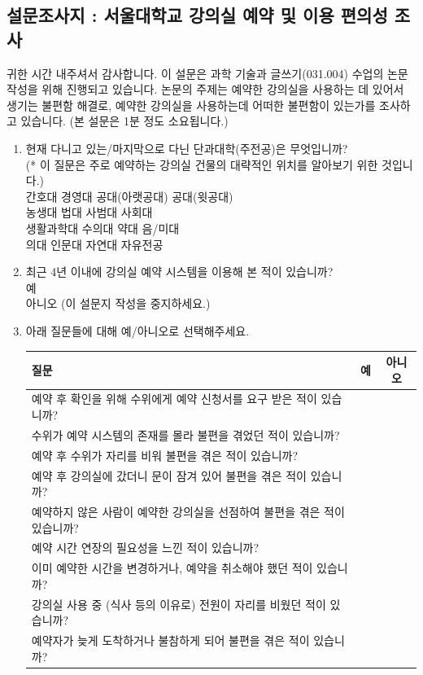 \documentclass[11pt,a4paper]{article}
\begin{document}
\subsection{설문조사지 : 서울대학교 강의실 예약 및 이용 편의성 조사}
귀한 시간 내주셔서 감사합니다. 이 설문은 과학 기술과 글쓰기(031.004) 수업의 논문 작성을 위해 진행되고 있습니다. 논문의 주제는 예약한 강의실을 사용하는 데 있어서 생기는 불편함 해결로, 예약한 강의실을 사용하는데 어떠한 불편함이 있는가를 조사하고 있습니다. (본 설문은 1분 정도 소요됩니다.)
\begin{enumerate}
\item 현재 다니고 있는/마지막으로 다닌 단과대학(주전공)은 무엇입니까?\\
(* 이 질문은 주로 예약하는 강의실 건물의 대략적인 위치를 알아보기 위한 것입니다.)\\
간호대 경영대 공대(아랫공대) 공대(윗공대)\\
농생대 법대 사범대 사회대\\
생활과학대 수의대 약대 음/미대\\
의대 인문대 자연대 자유전공
\item 최근 4년 이내에 강의실 예약 시스템을 이용해 본 적이 있습니까?\\
예\\
아니오 (이 설문지 작성을 중지하세요.)
\item 아래 질문들에 대해 예/아니오로 선택해주세요.
\begin{center}
\begin{tabular}{ | l | c | c | }
\hline
질문 & 예 & 아니오 \\
\hline
예약 후 확인을 위해 수위에게 예약 신청서를 요구 받은 적이 있습니까? & & \\
\hline
수위가 예약 시스템의 존재를 몰라 불편을 겪었던 적이 있습니까? & & \\
\hline
예약 후 수위가 자리를 비워 불편을 겪은 적이 있습니까? & & \\
\hline
예약 후 강의실에 갔더니 문이 잠겨 있어 불편을 겪은 적이 있습니까? & & \\
\hline
예약하지 않은 사람이 예약한 강의실을 선점하여 불편을 겪은 적이 있습니까? & & \\
\hline
예약 시간 연장의 필요성을 느낀 적이 있습니까? & & \\
\hline
이미 예약한 시간을 변경하거나, 예약을 취소해야 했던 적이 있습니까? & & \\
\hline
강의실 사용 중 (식사 등의 이유로) 전원이 자리를 비웠던 적이 있습니까? & & \\
\hline
예약자가 늦게 도착하거나 불참하게 되어 불편을 겪은 적이 있습니까? & & \\

\end{tabular}
\end{center}
\end{enumerate}
\end{document}
